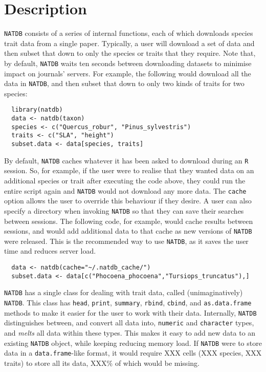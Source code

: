 \documentclass[12pt]{report}
\newcommand{\R}{\texttt{R}\xspace}
\newcommand{\natdb}{\texttt{NATDB}\xspace}
\begin{document}
\section{Description}
\natdb consists of a series of internal functions, each of which
downloads species trait data from a single paper. Typically, a user
will download a set of data and then subset that down to only the
species or traits that they require. Note that, by default, \natdb
waits ten seconds between downloading datasets to minimise impact on
journals' servers. For example, the following would download all the
data in \natdb, and then subset that down to only two kinds of traits
for two species:

\begin{verbatim}
  library(natdb)
  data <- natdb(taxon)
  species <- c("Quercus_robur", "Pinus_sylvestris")
  traits <- c("SLA", "height")
  subset.data <- data[species, traits]
\end{verbatim}

By default, \natdb caches whatever it has been asked to download
during an \R session. So, for example, if the user were to realise
that they wanted data on an additional species or trait after
executing the code above, they could run the entire script again and
\natdb would not download any more data. The \texttt{cache} option
allows the user to override this behaviour if they desire. A user can
also specify a directory when invoking \natdb so that they can save
their searches between sessions. The following code, for example,
would cache results between sessions, and would add additional data to
that cache as new versions of \natdb were released. This is the
recommended way to use \natdb, as it saves the user time and reduces
server load.

\begin{verbatim}
  data <- natdb(cache="~/.natdb_cache/")
  subset.data <- data[c("Phocoena_phocoena","Tursiops_truncatus"),]
\end{verbatim}

\natdb has a single class for dealing with trait data, called
(unimaginatively) \natdb. This class has \texttt{head},
\texttt{print}, \texttt{summary}, \texttt{rbind}, \texttt{cbind}, and
\texttt{as.data.frame} methods to make it easier for the user to work
with their data. Internally, \natdb distinguishes between, and convert
all data into, \texttt{numeric} and \texttt{character} types, and
\emph{melts} \autocite[\emph{sensu}][]{Wickham2007} all data within
these types. This makes it easy to add new data to an existing \natdb
object, while keeping reducing memory load. If \natdb were to store
data in a \texttt{data.frame}-like format, it would require XXX cells
(XXX species, XXX traits) to store all its data, XXX\% of which would
be missing.
\end{document}
